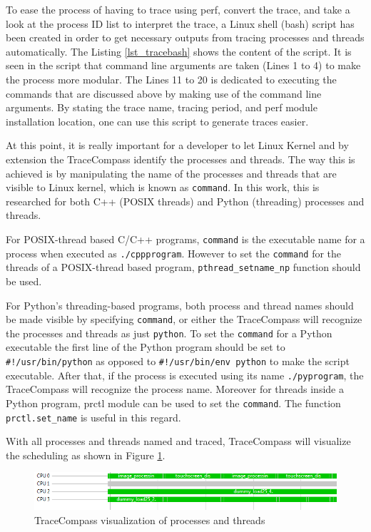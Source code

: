 \begin{itemize}
	To ease the process of having to trace using perf, convert the trace, and take a look at the process ID list to interpret the trace, a Linux shell (bash) script has been created in order to get necessary outputs from tracing processes and threads automatically. The Listing \ref{lst_tracebash} shows the content of the script. It is seen in the script that command line arguments are taken (Lines 1 to 4) to make the process more modular. The Lines 11 to 20 is dedicated to executing the commands that are discussed above by making use of the command line arguments. By stating the trace name, tracing period, and perf module installation location, one can use this script to generate traces easier. %
	
	
	At this point, it is really important for a developer to let Linux Kernel and by extension the TraceCompass identify the processes and threads. The way this is achieved is by manipulating the name of the processes and threads that are visible to Linux kernel, which is known as \texttt{command}. In this work, this is researched for both C++ (POSIX threads) and Python (threading) processes and threads.
	
	For POSIX-thread based C/C++ programs, \texttt{command} is the executable name for a process when executed as \texttt{./cppprogram}. However to set the \texttt{command} for the threads of a POSIX-thread based program, \texttt{pthread{\_}setname{\_}np} function should be used.
	
	For Python's threading-based programs, both process and thread names should be made visible by specifying \texttt{command}, or either the TraceCompass will recognize the processes and threads as just \texttt{python}. To set the \texttt{command} for a Python executable the first line of the Python program should be set to \texttt{\#!/usr/bin/python} as opposed to \texttt{\#!/usr/bin/env python} to make the script executable. After that, if the process is executed using its name \texttt{./pyprogram}, the TraceCompass will recognize the process name. Moreover for threads inside a Python program, prctl module can be used to set the \texttt{command}. The function \texttt{prctl.set{\_}name} is useful in this regard.
	
	With all processes and threads named and traced, TraceCompass will visualize the scheduling as shown in Figure \ref{fig:tracecompasscommands}.
	
	\begin{figure}[!ht]
		\centering
		\captionsetup{justification=centering}
		\includegraphics[width=\textwidth]{content/images/tracecompasscommands.png}
		\caption{TraceCompass visualization of processes and threads}
		\label{fig:tracecompasscommands}
	\end{figure}

\end{itemize}

